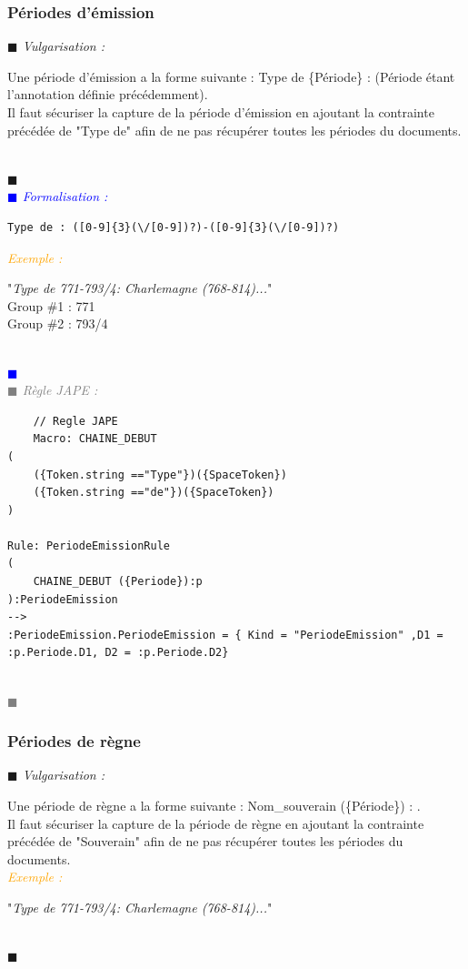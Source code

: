 \documentclass[a4paper, 11pt]{report}
\newenvironment{vulgarisation}
    {
    \textit{\textcolor{dark-blue}{$\blacksquare$  Vulgarisation : \\}}

    }
    {
    ~\\\textcolor{dark-blue}{$\blacksquare$}\\
    }
\newenvironment{formalisation}
    {
    \textit{\textcolor{blue}{$\blacksquare$  Formalisation : \\}}
    }
    {
    ~\\\textcolor{blue}{$\blacksquare$}\\
    }
\newenvironment{codage}
    {
    \textit{\textcolor{gray}{$\blacksquare$  Règle JAPE : \\}}
    }
    {
    ~\\\textcolor{gray}{$\blacksquare$}\\
    }
\newenvironment{exemple}
    {
    \textit{\textcolor{orange}{
    Exemple : \\}}
    }
    {\\
    }
\begin{document}
\newpage
\subsubsection{Périodes d'émission}
\begin{vulgarisation}
	Une période d'émission a la forme suivante :  \og Type de \{Période\} : \fg{} (Période étant l'annotation définie précédemment).\\
	Il faut sécuriser la capture de la période d'émission en ajoutant la contrainte précédée de "Type de" afin de ne pas récupérer toutes les périodes du documents.
\end{vulgarisation}
\begin{formalisation}
	\begin{verbatim}
Type de : ([0-9]{3}(\/[0-9])?)-([0-9]{3}(\/[0-9])?)
	\end{verbatim}
	\begin{exemple}
		"\emph{Type de 771-793/4: Charlemagne (768-814)...}" \\
		Group \#1 : 771 \\
		Group \#2 : 793/4
	\end{exemple}

\end{formalisation}
			\begin{codage}
	\begin{lstlisting}
	// Regle JAPE
	Macro: CHAINE_DEBUT
(
    ({Token.string =="Type"})({SpaceToken})
    ({Token.string =="de"})({SpaceToken})
)

Rule: PeriodeEmissionRule
(
    CHAINE_DEBUT ({Periode}):p
):PeriodeEmission
-->
:PeriodeEmission.PeriodeEmission = { Kind = "PeriodeEmission" ,D1 = :p.Periode.D1, D2 = :p.Periode.D2}
	\end{lstlisting}
	\end{codage}

\subsubsection{Périodes de règne}
\begin{vulgarisation}
	Une période de règne a la forme suivante : \og Nom\_souverain (\{Période\}) : \fg{}.\\
	Il faut sécuriser la capture de la période de règne en ajoutant la contrainte précédée de "Souverain" afin de ne pas récupérer toutes les périodes du documents.\\
	\begin{exemple}
		"\emph{Type de 771-793/4: Charlemagne (768-814)...}" 
	\end{exemple}
\end{vulgarisation}
\end{document}
